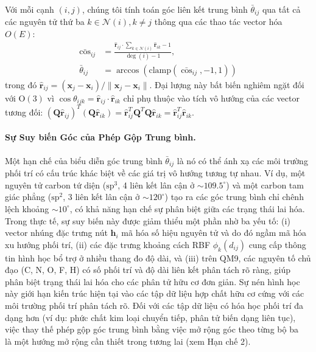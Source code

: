 \documentclass[10pt,twocolumn,letterpaper]{article}
\begin{document}
Với mỗi cạnh $(i, j)$, chúng tôi tính toán góc liên kết trung bình $\bar{\theta}_{ij}$ qua tất cả các nguyên tử thứ ba $k \in \mathcal{N}(i), k \neq j$ thông qua các thao tác vector hóa $O(E)$:
\begin{align}
    \bar{\cos}_{ij} &= \frac{\hat{\mathbf{r}}_{ij} \cdot \sum_{k \in \mathcal{N}(i)} \hat{\mathbf{r}}_{ik} - 1}{\deg(i) - 1}, \label{eq:angle} \\
    \bar{\theta}_{ij} &= \arccos\!\left(\mathrm{clamp}(\bar{\cos}_{ij}, -1, 1)\right) \nonumber
\end{align}
trong đó $\hat{\mathbf{r}}_{ij} = (\mathbf{x}_j - \mathbf{x}_i) / \|\mathbf{x}_j - \mathbf{x}_i\|$. Đại lượng này bất biến nghiêm ngặt đối với $\mathrm{O}(3)$ vì $\cos \theta_{ijk} = \hat{\mathbf{r}}_{ij} \cdot \hat{\mathbf{r}}_{ik}$ chỉ phụ thuộc vào tích vô hướng của các vector tương đối: $(\mathbf{Q}\hat{\mathbf{r}}_{ij})^T (\mathbf{Q}\hat{\mathbf{r}}_{ik}) = \hat{\mathbf{r}}_{ij}^T \mathbf{Q}^T \mathbf{Q} \hat{\mathbf{r}}_{ik} = \hat{\mathbf{r}}_{ij}^T \hat{\mathbf{r}}_{ik}$.

\paragraph{Sự Suy biến Góc của Phép Gộp Trung bình.}
Một hạn chế của biểu diễn góc trung bình $\bar{\theta}_{ij}$ là nó có thể ánh xạ các môi trường phối trí có cấu trúc khác biệt về các giá trị vô hướng tương tự nhau. Ví dụ, một nguyên tử carbon tứ diện ($\mathrm{sp}^3$, 4 liên kết lân cận ở $\sim 109.5^\circ$) và một carbon tam giác phẳng ($\mathrm{sp}^2$, 3 liên kết lân cận ở $\sim 120^\circ$) tạo ra các góc trung bình chỉ chênh lệch khoảng $\sim 10^\circ$, có khả năng hạn chế sự phân biệt giữa các trạng thái lai hóa.
Trong thực tế, sự suy biến này được giảm thiểu một phần nhờ ba yếu tố: (i) vector nhúng đặc trưng nút $\mathbf{h}_i$ mã hóa số hiệu nguyên tử và do đó ngầm mã hóa xu hướng phối trí, (ii) các đặc trưng khoảng cách RBF $\phi_k(d_{ij})$ cung cấp thông tin hình học bổ trợ ở nhiều thang đo độ dài, và (iii) trên QM9, các nguyên tố chủ đạo (C, N, O, F, H) có số phối trí và độ dài liên kết phân tách rõ ràng, giúp phân biệt trạng thái lai hóa cho các phân tử hữu cơ đơn giản.
Sự nén hình học này giới hạn kiến trúc hiện tại vào các tập dữ liệu hợp chất hữu cơ cứng với các môi trường phối trí phân tách rõ. Đối với các tập dữ liệu có hóa học phối trí đa dạng hơn (ví dụ: phức chất kim loại chuyển tiếp, phân tử biến dạng liên tục), việc thay thế phép gộp góc trung bình bằng việc mở rộng góc theo từng bộ ba~\cite{klicperaFastUncertaintyAwareDirectional2020, klicperaGemNetUniversalDirectional2021} là một hướng mở rộng cần thiết trong tương lai (xem Hạn chế 2).
\end{document}
